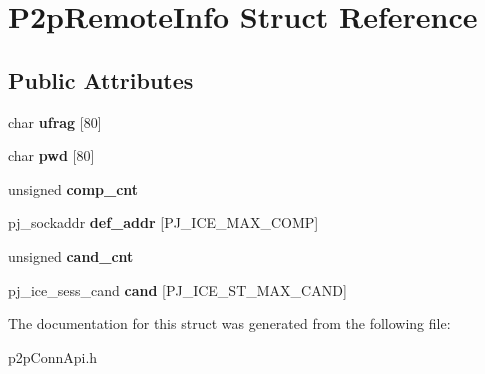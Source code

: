 \hypertarget{structP2pRemoteInfo}{
\section{P2pRemoteInfo Struct Reference}
\label{structP2pRemoteInfo}
}
\subsection*{Public Attributes}
\begin{DoxyCompactItemize}
\item 
\hypertarget{structP2pRemoteInfo_aeb023a14c460f4d5960e36a9dc10e06d}{
char {\bfseries ufrag} \mbox{[}80\mbox{]}}
\label{structP2pRemoteInfo_aeb023a14c460f4d5960e36a9dc10e06d}

\item 
\hypertarget{structP2pRemoteInfo_a24beff169e62368cca939e3904d0d914}{
char {\bfseries pwd} \mbox{[}80\mbox{]}}
\label{structP2pRemoteInfo_a24beff169e62368cca939e3904d0d914}

\item 
\hypertarget{structP2pRemoteInfo_a120bff9a641498f19b3f8728d4d1eb80}{
unsigned {\bfseries comp\_\-cnt}}
\label{structP2pRemoteInfo_a120bff9a641498f19b3f8728d4d1eb80}

\item 
\hypertarget{structP2pRemoteInfo_a8c750f28ffc2384ca473d318d02d484f}{
pj\_\-sockaddr {\bfseries def\_\-addr} \mbox{[}PJ\_\-ICE\_\-MAX\_\-COMP\mbox{]}}
\label{structP2pRemoteInfo_a8c750f28ffc2384ca473d318d02d484f}

\item 
\hypertarget{structP2pRemoteInfo_a9fe4fe3f796d2ed524332be099c0a2c8}{
unsigned {\bfseries cand\_\-cnt}}
\label{structP2pRemoteInfo_a9fe4fe3f796d2ed524332be099c0a2c8}

\item 
\hypertarget{structP2pRemoteInfo_a728680fe8a8b19af6605b9a6918d8393}{
pj\_\-ice\_\-sess\_\-cand {\bfseries cand} \mbox{[}PJ\_\-ICE\_\-ST\_\-MAX\_\-CAND\mbox{]}}
\label{structP2pRemoteInfo_a728680fe8a8b19af6605b9a6918d8393}

\end{DoxyCompactItemize}


The documentation for this struct was generated from the following file:\begin{DoxyCompactItemize}
\item 
p2pConnApi.h\end{DoxyCompactItemize}
